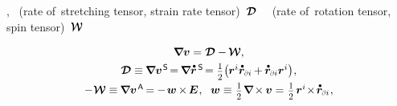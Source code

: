 \vspace{-0.1em}\noindent
{},  ~(rate of~stretching tensor, strain rate tensor)~${\bm{\mathcal{D}}}$ ~~(rate of~rotation tensor, spin tensor)~${\vorticitytensor}$

\nopagebreak\vspace{-0.1em}\begin{equation}
\begin{array}{c}
\boldnabla \bm{v} = \rateofdeformationtensor - \hspace{-0.1ex} \vorticitytensor
,
\\[.333em]
%
\rateofdeformationtensor \equiv \hspace{-0.12ex} \boldnabla {\bm{v}}^{\hspace{.2ex}\mathsf{S}} \hspace{-0.32ex}
=  \hspace{-0.2ex} \boldnabla \mathdotabove{\currentlocationvector}^{\hspace{.3ex}\mathsf{S}} \hspace{-0.32ex}
= \smalldisplaystyleonehalf \bigl( \hspace{-0.1ex} \currentlocationvector^{i} \mathdotabove{\currentlocationvector}_\differentialindex{i} \hspace{-0.1ex} + \hspace{-0.1ex} \mathdotabove{\currentlocationvector}_\differentialindex{i} \currentlocationvector^{i} \bigr)
\hspace{.1ex} ,
\\[.44em]
%
- \hspace{.1ex} \vorticitytensor \equiv \hspace{-0.12ex} \boldnabla {\bm{v}}^{\hspace{.2ex}\mathsf{A}} \hspace{-0.25ex}
= \hspace{-0.1ex} - \hspace{.24ex} \vorticityvector \hspace{-0.12ex} \times \hspace{-0.2ex} \UnitDyad
\hspace{.1ex} , \hspace{.6em}
\vorticityvector \equiv \hspace{.1ex} \smalldisplaystyleonehalf \hspace{.15ex} \boldnabla \hspace{-0.2ex} \times \hspace{-0.1ex} \bm{v}
= \hspace{.1ex} \smalldisplaystyleonehalf \hspace{.25ex} \currentlocationvector^{i} \hspace{-0.4ex}\times\hspace{-0.3ex} \mathdotabove{\currentlocationvector}_\differentialindex{i}
\hspace{.1ex} ,
\end{array}
\end{equation}

